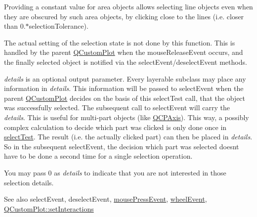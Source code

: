 Providing a constant value for area objects allows selecting line objects even when they are obscured by such area objects, by clicking close to the lines (i.\+e. closer than 0.$\ast$selection\+Tolerance).

The actual setting of the selection state is not done by this function. This is handled by the parent \hyperlink{classQCustomPlot}{Q\+Custom\+Plot} when the mouse\+Release\+Event occurs, and the finally selected object is notified via the select\+Event/deselect\+Event methods.

{\itshape details} is an optional output parameter. Every layerable subclass may place any information in {\itshape details}. This information will be passed to select\+Event when the parent \hyperlink{classQCustomPlot}{Q\+Custom\+Plot} decides on the basis of this select\+Test call, that the object was successfully selected. The subsequent call to select\+Event will carry the {\itshape details}. This is useful for multi-\/part objects (like \hyperlink{classQCPAxis}{Q\+C\+P\+Axis}). This way, a possibly complex calculation to decide which part was clicked is only done once in \hyperlink{classQCPLayerable_a4001c4d0dfec55598efa4d531f2179a9}{select\+Test}. The result (i.\+e. the actually clicked part) can then be placed in {\itshape details}. So in the subsequent select\+Event, the decision which part was selected doesn\textquotesingle{}t have to be done a second time for a single selection operation.

You may pass 0 as {\itshape details} to indicate that you are not interested in those selection details.

\begin{DoxySeeAlso}{See also}
select\+Event, deselect\+Event, \hyperlink{classQCPLayerable_af6567604818db90f4fd52822f8bc8376}{mouse\+Press\+Event}, \hyperlink{classQCPLayerable_a47dfd7b8fd99c08ca54e09c362b6f022}{wheel\+Event}, \hyperlink{classQCustomPlot_a5ee1e2f6ae27419deca53e75907c27e5}{Q\+Custom\+Plot\+::set\+Interactions} 
\end{DoxySeeAlso}


